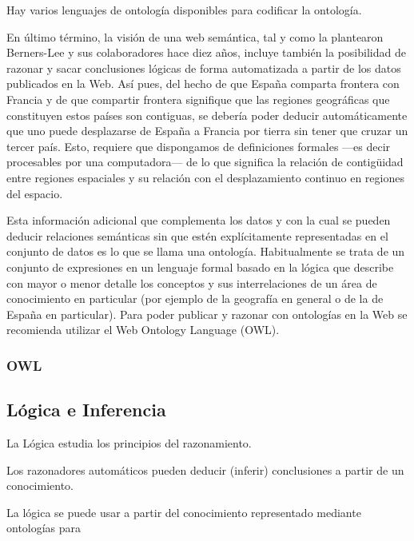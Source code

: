 
Hay varios lenguajes de ontología disponibles para codificar la ontología.


En último término, la visión de una web semántica, tal y como la plantearon Berners-Lee y sus colaboradores hace diez años, incluye también la posibilidad de razonar y sacar conclusiones lógicas de forma automatizada a partir de los datos publicados en la Web. Así pues, del hecho de que España comparta frontera con Francia y de que compartir frontera signifique que las regiones geográficas que constituyen estos países son contiguas, se debería poder deducir automáticamente que uno puede desplazarse de España a Francia por tierra sin tener que cruzar un tercer país. Esto, requiere que dispongamos de definiciones formales —es decir procesables por una computadora— de lo que significa la relación de contigüidad entre regiones espaciales y su relación con el desplazamiento continuo en regiones del espacio.

Esta información adicional que complementa los datos y con la cual se pueden deducir relaciones semánticas sin que estén explícitamente representadas en el conjunto de datos es lo que se llama una ontología. Habitualmente se trata de un conjunto de expresiones en un lenguaje formal basado en la lógica que describe con mayor o menor detalle los conceptos y sus interrelaciones de un área de conocimiento en particular (por ejemplo de la geografía en general o de la de España en particular). Para poder publicar y razonar con ontologías en la Web se recomienda utilizar el Web Ontology Language (OWL).

\subsubsection{OWL}


\subsection{Lógica e Inferencia}

La Lógica estudia los principios del razonamiento.

Los razonadores automáticos pueden deducir (inferir) conclusiones a partir de un conocimiento.

La lógica se puede usar a partir del conocimiento representado mediante ontologías para

